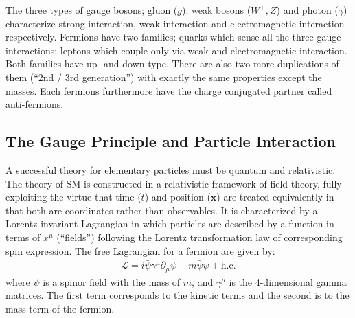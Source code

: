 The three types of gauge bosons; gluon ($g$); weak bosons ($W^{\pm},Z$) and photon ($\gamma$) characterize strong interaction, weak interaction and electromagnetic interaction respectively. 
Fermions have two families; quarks which sense all the three gauge interactions; leptons which couple only via weak and electromagnetic interaction. Both families have up- and down-type. There are also two more duplications of them (``2nd / 3rd generation'') with exactly the same properties except the masses. Each fermions furthermore have the charge conjugated partner called anti-fermions. \\


\subsection{The Gauge Principle and Particle Interaction} \label{sec::Introduction::gaugePrinciple}
A successful theory for elementary particles must be quantum and relativistic.
The theory of SM is constructed in a relativistic framework of field theory, fully exploiting the virtue that time ($t$) and position ($\bm{x}$) are treated equivalently in that both are coordinates rather than observables. It is characterized by a Lorentz-invariant Lagrangian in which particles are described by a function in terms of $x^\mu$ (``fields'') following the Lorentz transformation law of corresponding spin expression. 
The free Lagrangian for a fermion are given by:
\begin{align}
\mathcal{L} = i \bar{\psi} \gamma^\mu \partial_\mu \psi - m \bar{\psi}\psi + \mathrm{h.c.}
\label{eq::SMfreeLag}
\end{align}
where $\psi$ is a spinor field with the mass of $m$, and $\gamma^\mu$ is the 4-dimensional gamma matrices. 
The first term corresponds to the kinetic terms and the second is to the mass term of the fermion.


